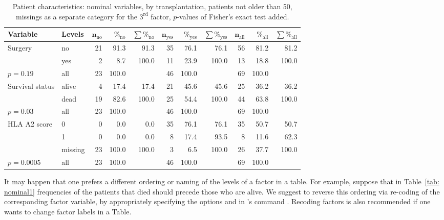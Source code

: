 \documentclass[nojss]{jss}\usepackage[]{graphicx}\usepackage[]{color}
\begin{document}
\renewcommand{\baselinestretch}{1.15}
\begin{center}
\begin{table}[ht]
\centering
{\footnotesize
\begin{tabular}{ll|rrr|rrr|rrr}
 \textbf{Variable} & \textbf{Levels} & $\mathbf{n_{\mathrm{no}}}$ & $\mathbf{\%_{\mathrm{no}}}$ & $\mathbf{\sum \%_{\mathrm{no}}}$ & $\mathbf{n_{\mathrm{yes}}}$ & $\mathbf{\%_{\mathrm{yes}}}$ & $\mathbf{\sum \%_{\mathrm{yes}}}$ & $\mathbf{n_{\mathrm{all}}}$ & $\mathbf{\%_{\mathrm{all}}}$ & $\mathbf{\sum \%_{\mathrm{all}}}$ \\ 
  \hline
Surgery & no & 21 & 91.3 & 91.3 & 35 & 76.1 & 76.1 & 56 & 81.2 & 81.2 \\ 
   & yes & 2 & 8.7 & 100.0 & 11 & 23.9 & 100.0 & 13 & 18.8 & 100.0 \\ 
   \hline
$p= 0.19$ & all & 23 & 100.0 &  & 46 & 100.0 &  & 69 & 100.0 &  \\ 
   \hline
\hline
Survival status & alive & 4 & 17.4 & 17.4 & 21 & 45.6 & 45.6 & 25 & 36.2 & 36.2 \\ 
   & dead & 19 & 82.6 & 100.0 & 25 & 54.4 & 100.0 & 44 & 63.8 & 100.0 \\ 
   \hline
$p= 0.03$ & all & 23 & 100.0 &  & 46 & 100.0 &  & 69 & 100.0 &  \\ 
   \hline
\hline
HLA A2 score & 0 & 0 & 0.0 & 0.0 & 35 & 76.1 & 76.1 & 35 & 50.7 & 50.7 \\ 
   & 1 & 0 & 0.0 & 0.0 & 8 & 17.4 & 93.5 & 8 & 11.6 & 62.3 \\ 
   & missing & 23 & 100.0 & 100.0 & 3 & 6.5 & 100.0 & 26 & 37.7 & 100.0 \\ 
   \hline
$p= 0.0005$ & all & 23 & 100.0 &  & 46 & 100.0 &  & 69 & 100.0 &  \\ 
   \hline
\hline
\end{tabular}
}
\caption{Patient characteristics: nominal variables, by transplantation, patients not older than 50, 
  missings as a separate category for the $3^{\mathrm{rd}}$ factor, $p$-values of Fisher's exact test added.} 
\label{tab: nominal2}
\end{table}

\end{center}
\renewcommand{\baselinestretch}{1}

It may happen that one prefers a different ordering or naming of the levels of a factor in a table. For example, 
suppose that in Table~\ref{tab: nominal1} frequencies of the patients that died should precede those who are alive. 
We suggest to reverse this ordering via re-coding of the corresponding factor variable, by appropriately specifying
the options  and  in 's command .
Recoding factors is also recommended if one wants to change factor labels in a Table.
\end{document}

